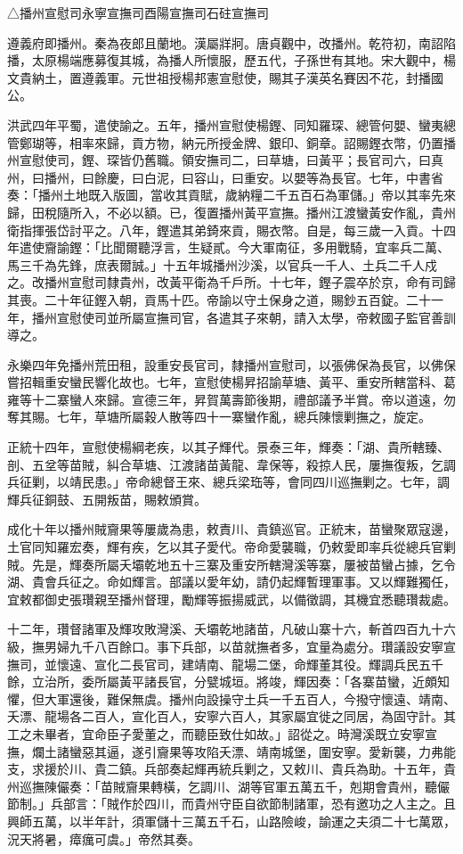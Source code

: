 
\begin{pinyinscope}
△播州宣慰司永寧宣撫司酉陽宣撫司石砫宣撫司

遵義府即播州。秦為夜郎且蘭地。漢屬牂牁。唐貞觀中，改播州。乾符初，南詔陷播，太原楊端應募復其城，為播人所懷服，歷五代，子孫世有其地。宋大觀中，楊文貴納土，置遵義軍。元世祖授楊邦憲宣慰使，賜其子漢英名賽因不花，封播國公。

洪武四年平蜀，遣使諭之。五年，播州宣慰使楊鏗、同知羅琛、總管何嬰、蠻夷總管鄭瑚等，相率來歸，貢方物，納元所授金牌、銀印、銅章。詔賜鏗衣幣，仍置播州宣慰使司，鏗、琛皆仍舊職。領安撫司二，曰草塘，曰黃平；長官司六，曰真州，曰播州，曰餘慶，曰白泥，曰容山，曰重安。以嬰等為長官。七年，中書省奏：「播州土地既入版圖，當收其貢賦，歲納糧二千五百石為軍儲。」帝以其率先來歸，田稅隨所入，不必以額。已，復置播州黃平宣撫。播州江渡蠻黃安作亂，貴州衛指揮張岱討平之。八年，鏗遣其弟錡來貢，賜衣幣。自是，每三歲一入貢。十四年遣使齎諭鏗：「比聞爾聽浮言，生疑貳。今大軍南征，多用戰騎，宜率兵二萬、馬三千為先鋒，庶表爾誠。」十五年城播州沙溪，以官兵一千人、土兵二千人戍之。改播州宣慰司隸貴州，改黃平衛為千戶所。十七年，鏗子震卒於京，命有司歸其喪。二十年征鏗入朝，貢馬十匹。帝諭以守土保身之道，賜鈔五百錠。二十一年，播州宣慰使司並所屬宣撫司官，各遣其子來朝，請入太學，帝敕國子監官善訓導之。

永樂四年免播州荒田租，設重安長官司，隸播州宣慰司，以張佛保為長官，以佛保嘗招輯重安蠻民響化故也。七年，宣慰使楊昇招諭草塘、黃平、重安所轄當科、葛雍等十二寨蠻人來歸。宣德三年，昇賀萬壽節後期，禮部議予半賞。帝以道遠，勿奪其賜。七年，草塘所屬穀人散等四十一寨蠻作亂，總兵陳懷剿撫之，旋定。

正統十四年，宣慰使楊綱老疾，以其子輝代。景泰三年，輝奏：「湖、貴所轄臻、剖、五坌等苗賊，糾合草塘、江渡諸苗黃龍、韋保等，殺掠人民，屢撫復叛，乞調兵征剿，以靖民患。」帝命總督王來、總兵梁珤等，會同四川巡撫剿之。七年，調輝兵征銅鼓、五開叛苗，賜敕頒賞。

成化十年以播州賊齎果等屢歲為患，敕責川、貴鎮巡官。正統末，苗蠻聚眾寇邊，土官同知羅宏奏，輝有疾，乞以其子愛代。帝命愛襲職，仍敕愛即率兵從總兵官剿賊。先是，輝奏所屬夭壩乾地五十三寨及重安所轄灣溪等寨，屢被苗蠻占據，乞令湖、貴會兵征之。命如輝言。部議以愛年幼，請仍起輝暫理軍事。又以輝難獨任，宜敕都御史張瓚親至播州督理，勵輝等振揚威武，以備徵調，其機宜悉聽瓚裁處。

十二年，瓚督諸軍及輝攻敗灣溪、夭壩乾地諸苗，凡破山寨十六，斬首四百九十六級，撫男婦九千八百餘口。事下兵部，以苗就撫者多，宜量為處分。瓚議設安寧宣撫司，並懷遠、宣化二長官司，建靖南、龍場二堡，命輝董其役。輝調兵民五千餘，立治所，委所屬黃平諸長官，分甓城垣。將竣，輝因奏：「各寨苗蠻，近頗知懼，但大軍還後，難保無虞。播州向設操守土兵一千五百人，今撥守懷遠、靖南、夭漂、龍場各二百人，宣化百人，安寧六百人，其家屬宜徙之同居，為固守計。其工之未畢者，宜命臣子愛董之，而聽臣致仕如故。」詔從之。時灣溪既立安寧宣撫，爛土諸蠻惡其逼，遂引齎果等攻陷夭漂、靖南城堡，圍安寧。愛新襲，力弗能支，求援於川、貴二鎮。兵部奏起輝再統兵剿之，又敕川、貴兵為助。十五年，貴州巡撫陳儼奏：「苗賊齎果轉橫，乞調川、湖等官軍五萬五千，剋期會貴州，聽儼節制。」兵部言：「賊作於四川，而貴州守臣自欲節制諸軍，恐有邀功之人主之。且興師五萬，以半年計，須軍儲十三萬五千石，山路險峻，諭運之夫須二十七萬眾，況天將暑，瘴癘可虞。」帝然其奏。


\end{pinyinscope}
